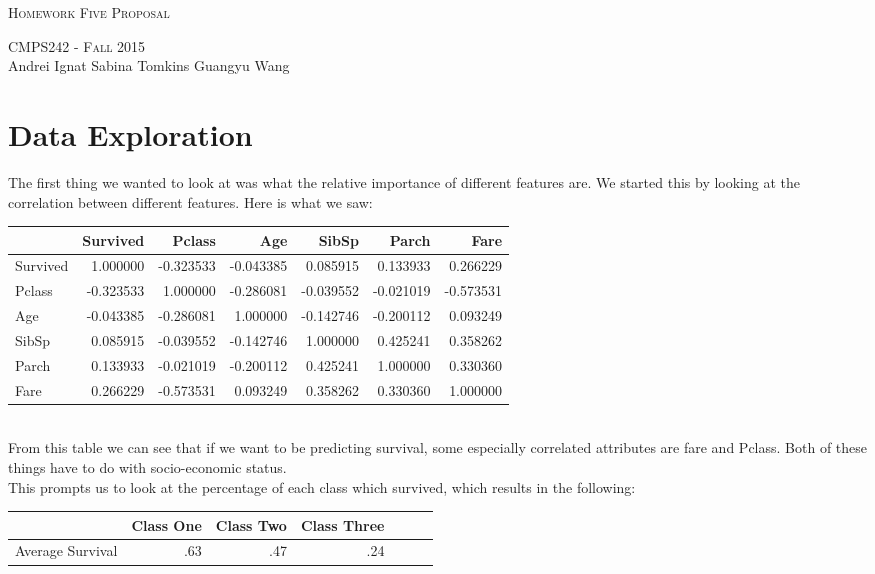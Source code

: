 \documentclass{article}
\begin{document}
\begin{center}
\Huge{\textsc{Homework Five Proposal}} 

\Large\textsc{CMPS242 - Fall 2015}\\

\large{Andrei Ignat  \hfill Sabina Tomkins \hfill Guangyu Wang} 
\end{center}

\section*{Data Exploration}
The first thing we wanted to look at was what the relative importance of different features are. We started this by looking at the correlation between different features. Here is what we saw: 

\begin{tabular}{|l|r|r|r|r|r|r|}
\hline
 &  Survived &    Pclass &       Age &     SibSp &     Parch &      Fare \\
\hline
Survived &  1.000000 & -0.323533 & -0.043385 &  0.085915 &  0.133933 &  0.266229 \\
\hline
Pclass   & -0.323533 &  1.000000 & -0.286081 & -0.039552 & -0.021019 & -0.573531 \\
\hline
Age      & -0.043385 & -0.286081 &  1.000000 & -0.142746 & -0.200112 &  0.093249 \\
\hline
SibSp    &  0.085915 & -0.039552 & -0.142746 &  1.000000 &  0.425241 &  0.358262 \\
\hline
Parch    &  0.133933 & -0.021019 & -0.200112 &  0.425241 &  1.000000 &  0.330360 \\
\hline
Fare     &  0.266229 & -0.573531 &  0.093249 &  0.358262 &  0.330360 &  1.000000 \\
\hline
\end{tabular}\\


From this table we can see that if we want to be predicting survival, some especially correlated attributes are fare and Pclass. Both of these things have to do with socio-economic status. \\

This prompts us to look at the percentage of each class which survived, which results in the following:


\begin{tabular}{|l|r|r|r|r|r|r|}
\hline
&  Class One &    Class Two &       Class Three\\
\hline
Average Survival &  .63 & .47 & .24\\
\hline

\end{tabular}





\end{document}
